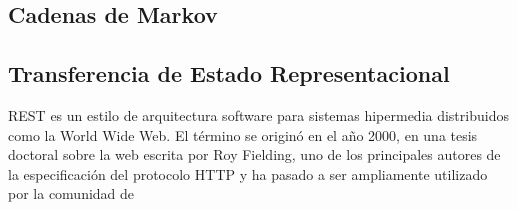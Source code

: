 
\subsection{Cadenas de Markov}



\subsection{Transferencia de Estado Representacional}

 REST es un estilo de arquitectura software para sistemas hipermedia distribuidos como la World Wide Web. El término se originó en el año 2000, en una tesis doctoral sobre la web escrita por Roy Fielding, uno de los principales autores de la especificación del protocolo HTTP y ha pasado a ser ampliamente utilizado por la comunidad de 
